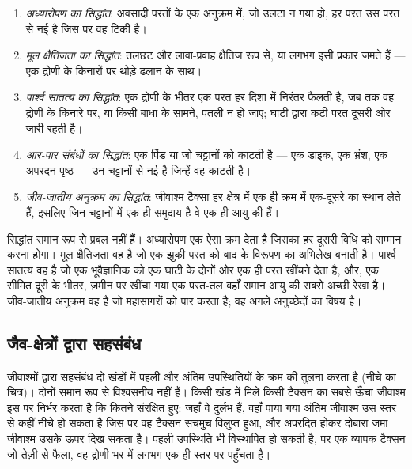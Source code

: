 \begin{definition}[स्तरिकी के सिद्धांत]\label{def:b1:stratigraphic-scale:principles}
\begin{enumerate}
  \item \emph{अध्यारोपण का सिद्धांत}: अवसादी परतों के एक अनुक्रम में, जो उलटा न गया हो, हर परत उस परत से नई है जिस पर वह टिकी है।
  \item \emph{मूल क्षैतिजता का सिद्धांत}: तलछट और लावा-प्रवाह क्षैतिज रूप से, या लगभग इसी प्रकार जमते हैं --- एक द्रोणी के किनारों पर थोड़े ढलान के साथ।
  \item \emph{पार्श्व सातत्य का सिद्धांत}: एक द्रोणी के भीतर एक परत हर दिशा में निरंतर फैलती है, जब तक वह द्रोणी के किनारे पर, या किसी बाधा के सामने, पतली न हो जाए; घाटी द्वारा कटी परत दूसरी ओर जारी रहती है।
  \item \emph{आर-पार संबंधों का सिद्धांत}: एक पिंड या  जो चट्टानों को काटती है --- एक डाइक, एक भ्रंश, एक अपरदन-पृष्ठ --- उन चट्टानों से नई है जिन्हें वह काटती है।
  \item \emph{जीव-जातीय अनुक्रम का सिद्धांत}: जीवाश्म टैक्सा हर क्षेत्र में एक ही क्रम में एक-दूसरे का स्थान लेते हैं, इसलिए जिन चट्टानों में एक ही समुदाय है वे एक ही आयु की हैं।
\end{enumerate}
\end{definition}

सिद्धांत समान रूप से प्रबल नहीं हैं। अध्यारोपण एक ऐसा क्रम देता है जिसका हर दूसरी विधि को सम्मान करना होगा। मूल क्षैतिजता वह है जो एक झुकी परत को बाद के विरूपण का अभिलेख बनाती है। पार्श्व सातत्य वह है जो एक भूवैज्ञानिक को एक घाटी के दोनों ओर एक ही परत खींचने देता है, और, एक सीमित दूरी के भीतर, ज़मीन पर खींचा गया एक परत-तल वहाँ समान आयु की सबसे अच्छी रेखा है। जीव-जातीय अनुक्रम वह है जो महासागरों को पार करता है; वह अगले अनुच्छेदों का विषय है।

\subsection*{जैव-क्षेत्रों द्वारा सहसंबंध}

जीवाश्मों द्वारा सहसंबंध दो खंडों में पहली और अंतिम उपस्थितियों के क्रम की तुलना करता है (नीचे का चित्र)। दोनों समान रूप से विश्वसनीय नहीं हैं। किसी खंड में मिले किसी टैक्सन का सबसे ऊँचा जीवाश्म इस पर निर्भर करता है कि कितने संरक्षित हुए: जहाँ वे दुर्लभ हैं, वहाँ पाया गया अंतिम जीवाश्म उस स्तर से कहीं नीचे हो सकता है जिस पर वह टैक्सन सचमुच विलुप्त हुआ, और अपरदित होकर दोबारा जमा जीवाश्म उसके ऊपर दिख सकता है। पहली उपस्थिति भी विस्थापित हो सकती है, पर एक व्यापक टैक्सन जो तेज़ी से फैला, वह द्रोणी भर में लगभग एक ही स्तर पर पहुँचता है।

